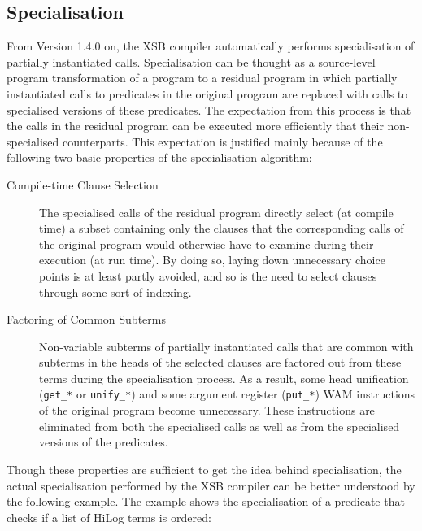 \subsection{Specialisation}\label{specialisation}

From Version 1.4.0 on, the XSB compiler automatically performs
specialisation of partially instantiated calls.  Specialisation can be
thought as a source-level program transformation of a program to a
residual program in which partially instantiated calls to predicates
in the original program are replaced with calls to specialised versions
of these predicates.  The expectation from this process is that the
calls in the residual program can be executed more efficiently that
their non-specialised counterparts.  This expectation is justified
mainly because of the following two basic properties of the
specialisation algorithm:
\begin{description}
\item[Compile-time Clause Selection] The specialised calls of the
	residual program  directly select (at compile time) a subset
	containing only the clauses that the corresponding calls of the
	original program would otherwise have to examine during their
	execution (at run time).  By doing so, laying down unnecessary
	choice points is at least partly avoided, and so is the need to
	select clauses through some sort of indexing.
\item[Factoring of Common Subterms] Non-variable subterms of partially
	instantiated calls that are common with subterms in the heads
	of the selected clauses are factored out from these terms
	during the specialisation process.  As a result, some head
	unification ({\tt get\_*} or {\tt unify\_*}) and some argument
	register ({\tt put\_*}) WAM instructions of the original
	program become unnecessary.  These instructions are eliminated
	from both the specialised calls as well as from the specialised
	versions of the predicates.
\end{description}
Though these properties are sufficient to get the idea behind
specialisation, the actual specialisation performed by the XSB
compiler can be better understood by the following example.  The
example shows the specialisation of a predicate that checks if a list
of HiLog terms is ordered:
